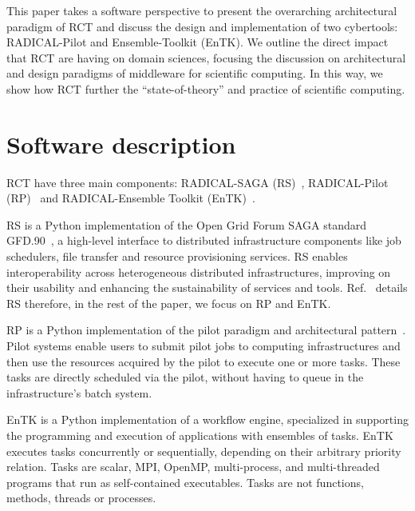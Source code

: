 \documentclass[preprint,12pt, a4paper]{elsarticle}
\begin{document}
This paper takes a software perspective to present the overarching
architectural paradigm of RCT and discuss the design and implementation of
two cybertools: RADICAL-Pilot and Ensemble-Toolkit (EnTK). We outline the
direct impact that RCT are having on domain sciences, focusing the discussion
on architectural and design paradigms of middleware for scientific computing.
In this way, we show how RCT further the ``state-of-theory'' and practice of
scientific computing.


\section{Software description}\label{sec:description}



RCT have three main components: RADICAL-SAGA (RS)~\cite{merzky2015saga},
RADICAL-Pilot (RP)~\cite{merzky2018using} and RADICAL-Ensemble Toolkit
(EnTK)~\cite{balasubramanian2016ensemble,balasubramanian2018harnessing}.

RS is a Python implementation of the Open Grid Forum SAGA standard
GFD.90~\cite{goodale2006saga}, a high-level interface to distributed
infrastructure components like job schedulers, file transfer and resource
provisioning services. RS enables interoperability across heterogeneous
distributed infrastructures, improving on their usability and enhancing the
sustainability of services and tools. Ref.~\cite{merzky2015saga} details RS
therefore, in the rest of the paper, we focus on RP and EnTK.

RP is a Python implementation of the pilot paradigm and architectural
pattern~\cite{turilli2018comprehensive}. Pilot systems enable users to submit
pilot jobs to computing infrastructures and then use the resources acquired
by the pilot to execute one or more tasks. These tasks are directly scheduled
via the pilot, without having to queue in the infrastructure's batch system.

EnTK is a Python implementation of a workflow engine, specialized in
supporting the programming and execution of applications with ensembles of
tasks. EnTK %
executes tasks concurrently or sequentially, depending on their arbitrary
priority relation. Tasks are scalar, MPI, OpenMP, multi-process, and
multi-threaded programs that run as self-contained executables. Tasks are not
functions, methods, threads or processes. 
\end{document}
